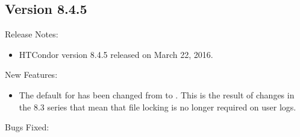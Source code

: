 \subsection*{\label{sec:New-8-4-5}Version 8.4.5}

\noindent Release Notes:

\begin{itemize}

\item HTCondor version 8.4.5 released on March 22, 2016.

\end{itemize}


\noindent New Features:

\begin{itemize}

\item The default for  has
been changed from  to .  This is the result
of changes in the 8.3 series that mean that file locking is no
longer required on user logs.

\end{itemize}

\noindent Bugs Fixed:

